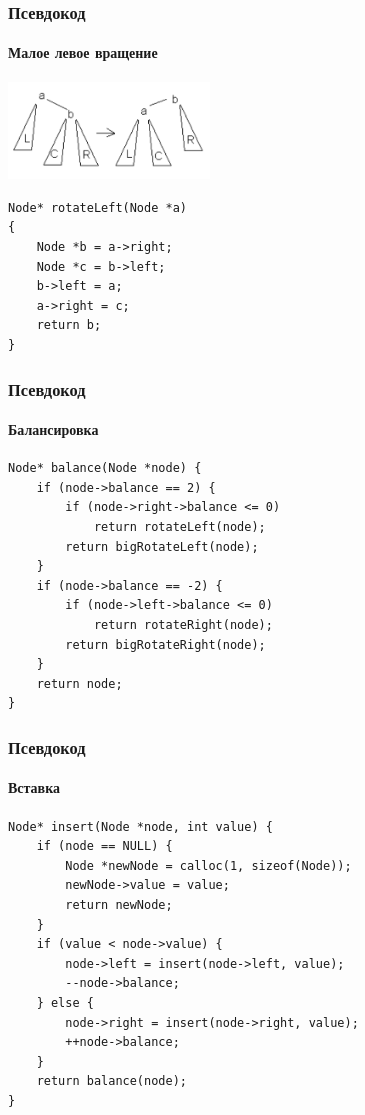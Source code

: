 \documentclass[xetex,mathserif,serif]{beamer}
\begin{document}
    \begin{frame}[fragile]
        \frametitle{Псевдокод}
        \framesubtitle{Малое левое вращение}
        \begin{center}
            \includegraphics[width=0.4\textwidth]{small-left-rotation.png}
        \end{center}
        \begin{verbatim}
Node* rotateLeft(Node *a)
{
    Node *b = a->right;
    Node *c = b->left;
    b->left = a;
    a->right = c;
    return b;
}
        \end{verbatim}
    \end{frame}

    \begin{frame}[fragile]
        \frametitle{Псевдокод}
        \framesubtitle{Балансировка}
        \begin{verbatim}
Node* balance(Node *node) {
    if (node->balance == 2) {
        if (node->right->balance <= 0)
            return rotateLeft(node);
        return bigRotateLeft(node);
    }
    if (node->balance == -2) {
        if (node->left->balance <= 0)
            return rotateRight(node);
        return bigRotateRight(node);
    }
    return node;
}
        \end{verbatim}
    \end{frame}

    \begin{frame}[fragile]
        \frametitle{Псевдокод}
        \framesubtitle{Вставка}
        \begin{verbatim}
Node* insert(Node *node, int value) {
    if (node == NULL) {
        Node *newNode = calloc(1, sizeof(Node));
        newNode->value = value;
        return newNode;
    }
    if (value < node->value) {
        node->left = insert(node->left, value);
        --node->balance;
    } else {
        node->right = insert(node->right, value);
        ++node->balance;
    }
    return balance(node);
}
        \end{verbatim}
    \end{frame}
\end{document}
